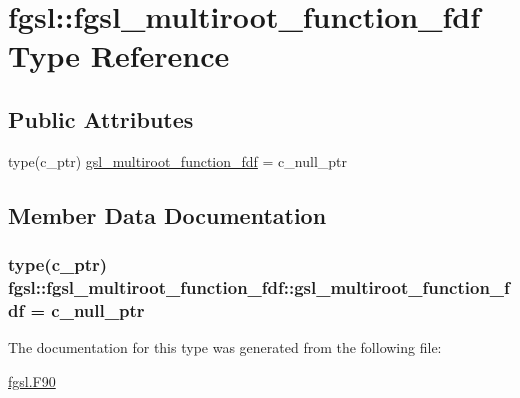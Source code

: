 \hypertarget{structfgsl_1_1fgsl__multiroot__function__fdf}{}\section{fgsl\+:\+:fgsl\+\_\+multiroot\+\_\+function\+\_\+fdf Type Reference}
\label{structfgsl_1_1fgsl__multiroot__function__fdf}
\subsection*{Public Attributes}
\begin{DoxyCompactItemize}
\item 
type(c\+\_\+ptr) \hyperlink{structfgsl_1_1fgsl__multiroot__function__fdf_a7e4614c5bef5c785a7e73924069b5d75}{gsl\+\_\+multiroot\+\_\+function\+\_\+fdf} = c\+\_\+null\+\_\+ptr
\end{DoxyCompactItemize}


\subsection{Member Data Documentation}
\hypertarget{structfgsl_1_1fgsl__multiroot__function__fdf_a7e4614c5bef5c785a7e73924069b5d75}{}
\subsubsection[{gsl\+\_\+multiroot\+\_\+function\+\_\+fdf}]{\setlength{\rightskip}{0pt plus 5cm}type(c\+\_\+ptr) fgsl\+::fgsl\+\_\+multiroot\+\_\+function\+\_\+fdf\+::gsl\+\_\+multiroot\+\_\+function\+\_\+fdf = c\+\_\+null\+\_\+ptr}\label{structfgsl_1_1fgsl__multiroot__function__fdf_a7e4614c5bef5c785a7e73924069b5d75}


The documentation for this type was generated from the following file\+:\begin{DoxyCompactItemize}
\item 
\hyperlink{fgsl_8F90}{fgsl.\+F90}\end{DoxyCompactItemize}
